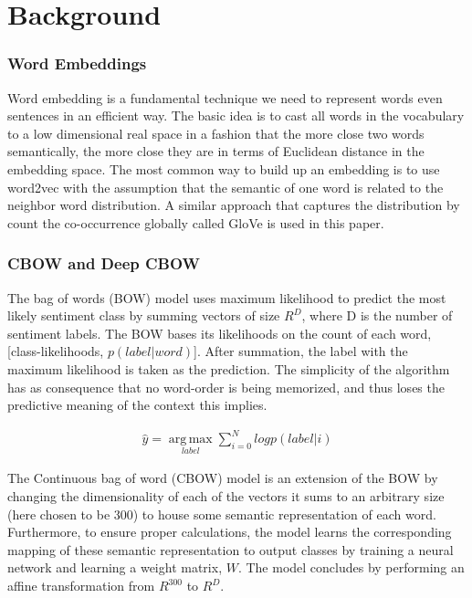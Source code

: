 \section{Background}
\label{sec: background}
\subsubsection{Word Embeddings}
Word embedding is a fundamental technique we need to represent words even
sentences in an efficient way. The basic idea is to cast all words in the
vocabulary to a low dimensional real space in a fashion that the more close two
words semantically, the more close they are in terms of Euclidean distance in
the embedding space. The most common way to build up an embedding is to use
word2vec\cite{mikolov2013distributed} with the assumption that the semantic of one word is related to the
neighbor word distribution. A similar approach that captures the distribution by
count the co-occurrence globally called GloVe\cite{pennington2014glove} is used in this paper.

\subsubsection{CBOW and Deep CBOW}
The bag of words (BOW) model uses maximum likelihood to predict the most likely
sentiment class by summing vectors of size $R^{D}$, where D is the number of
sentiment labels. The BOW bases its likelihoods on the count of each word,
[class-likelihoods, $p(label|word)$]. After summation, the label with the
maximum likelihood is taken as the prediction. The simplicity of the algorithm
has as consequence that no word-order is being memorized, and thus loses the
predictive meaning of the context this implies.

\begin{align*}
    \hat{y} = \operatorname*{arg\,max}_{label} \sum^{N}_{i=0} log p(label|i)
\end{align*}

The Continuous bag of word (CBOW) model is an extension of the BOW by changing
the dimensionality of each of the vectors it sums to an arbitrary size (here
chosen to be 300) to house some semantic representation of each word.
Furthermore, to ensure proper calculations, the model learns the corresponding
mapping of these semantic representation to output classes by training a neural
network and learning a weight matrix, $W$. The model concludes by performing an
affine transformation from $R^{300}$ to $R^D$.

